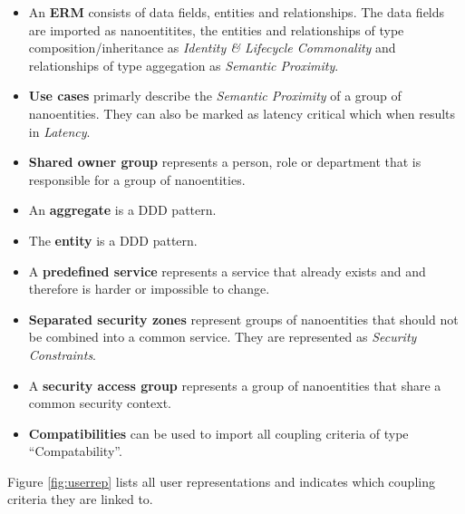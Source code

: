\begin{itemize}
\item An \textbf{\gls{ERM}} consists of data fields, entities and relationships. The data fields are imported as nanoentitites, the entities and relationships of type composition/inheritance as\textit{ Identity \& Lifecycle Commonality} and relationships of type aggegation as \textit{Semantic Proximity}.
\item \textbf{Use cases} primarly describe the \textit{Semantic Proximity} of a group of nanoentities. They can also be marked as latency critical which when results in \textit{Latency}.
\item \textbf{Shared owner group} represents a person, role or department that is responsible for a group of nanoentities.
\item An \textbf{aggregate} is a \gls{DDD} pattern. 
\item The \textbf{entity} is a \gls{DDD} pattern.
\item A \textbf{predefined service} represents a service that already exists and and therefore is harder or impossible to change.
\item \textbf{Separated security zones} represent groups of nanoentities that should not be combined into a common service. They are represented as \textit{Security Constraints}.
\item A \textbf{security access group} represents a group of nanoentities that share a common security context.
\item \textbf{Compatibilities} can be used to import all coupling criteria of type \enquote{Compatability}.
\end{itemize}

Figure \ref{fig:userrep} lists all user representations and indicates which coupling criteria they are linked to.

